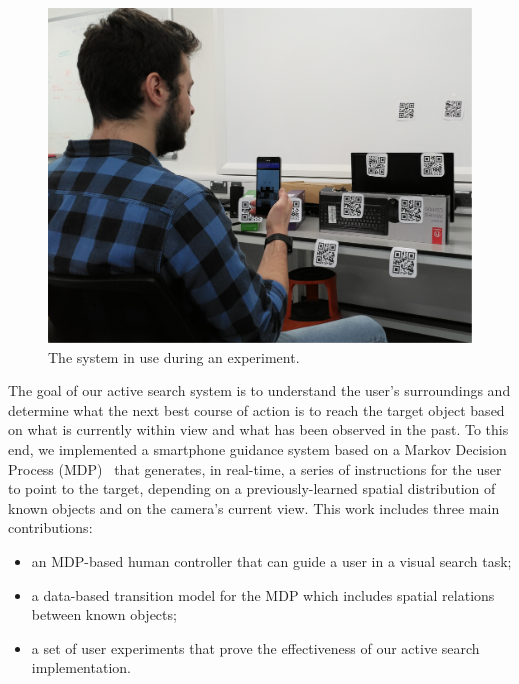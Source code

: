 \documentclass[a4paper, twoside]{article}
\begin{document}
\begin{figure}
  \centering
  \includegraphics[width=0.85\columnwidth]{figures/system_use.png}
  \caption{The system in use during an experiment. }\label{fig:system-use}
\end{figure}

The goal of our active search system is to understand the user's surroundings and determine what the next best course of action is to reach the target object based on what is currently within view and what has been observed in the past. To this end, we implemented a smartphone guidance system based on a Markov Decision Process (MDP)~\cite{bellman1957markovian} that generates, in real-time, a series of instructions for the user to point to the target, depending on a previously-learned spatial distribution of known objects and on the camera's current view.  
%
This work includes three main contributions:

\begin{itemize}
  \item an MDP-based human controller that can guide a user in a visual search task;
  \item a data-based transition model for the MDP which includes spatial relations between known objects;
  \item a set of user experiments that prove the effectiveness of our active search implementation.
\end{itemize}

\end{document}
